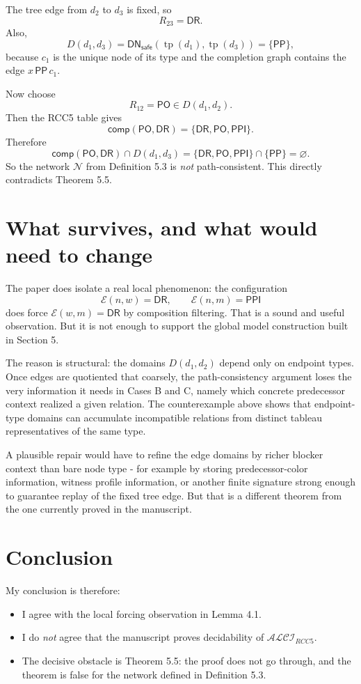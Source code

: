 \documentclass[11pt]{article}
\newcommand{\DR}{\mathsf{DR}}
\newcommand{\PO}{\mathsf{PO}}
\newcommand{\PP}{\mathsf{PP}}
\newcommand{\PPI}{\mathsf{PPI}}
\newcommand{\comp}{\mathsf{comp}}
\newcommand{\Elab}{\mathcal{E}}
\newcommand{\DNsafe}{\mathsf{DN}_{\mathsf{safe}}}
\begin{document}
The tree edge from $d_2$ to $d_3$ is fixed, so
\[
R_{23}=\DR.
\]
Also,
\[
D(d_1,d_3)=\DNsafe(\operatorname{tp}(d_1),\operatorname{tp}(d_3))=\{\PP\},
\]
because $c_1$ is the unique node of its type and the completion graph contains the edge $x\,\PP\,c_1$.

Now choose
\[
R_{12}=\PO\in D(d_1,d_2).
\]
Then the RCC5 table gives
\[
\comp(\PO,\DR)=\{\DR,\PO,\PPI\}.
\]
Therefore
\[
\comp(\PO,\DR)\cap D(d_1,d_3)
=
\{\DR,\PO,\PPI\}\cap\{\PP\}
=
\varnothing.
\]
So the network $\mathcal N$ from Definition 5.3 is \emph{not} path-consistent. This directly contradicts Theorem 5.5.

\section{What survives, and what would need to change}

The paper does isolate a real local phenomenon: the configuration
\[
\Elab(n,w)=\DR, \qquad \Elab(n,m)=\PPI
\]
does force $\Elab(w,m)=\DR$ by composition filtering. That is a sound and useful observation. But it is not enough to support the global model construction built in Section 5.

The reason is structural: the domains $D(d_1,d_2)$ depend only on endpoint types. Once edges are quotiented that coarsely, the path-consistency argument loses the very information it needs in Cases B and C, namely which concrete predecessor context realized a given relation. The counterexample above shows that endpoint-type domains can accumulate incompatible relations from distinct tableau representatives of the same type.

A plausible repair would have to refine the edge domains by richer blocker context than bare node type - for example by storing predecessor-color information, witness profile information, or another finite signature strong enough to guarantee replay of the fixed tree edge. But that is a different theorem from the one currently proved in the manuscript.

\section{Conclusion}

My conclusion is therefore:
\begin{itemize}[leftmargin=1.5em]
  \item I agree with the local forcing observation in Lemma 4.1.
  \item I do \emph{not} agree that the manuscript proves decidability of $\mathcal{ALCI}_{RCC5}$.
  \item The decisive obstacle is Theorem 5.5: the proof does not go through, and the theorem is false for the network defined in Definition 5.3.
\end{itemize}
\end{document}
